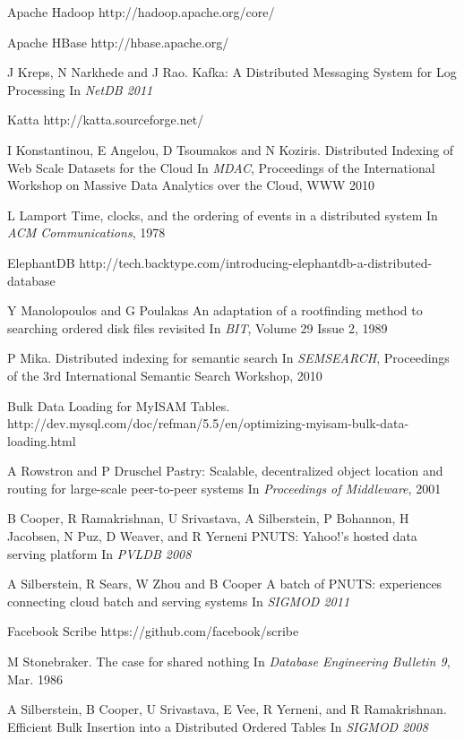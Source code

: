 \documentclass[10pt,twocolumn,preprint,natbib,authoryear]{sigplanconf}
\begin{document}
\begin{thebibliography}
Apache Hadoop
\newblock http://hadoop.apache.org/core/

Apache HBase
\newblock http://hbase.apache.org/

J Kreps, N Narkhede and J Rao.
\newblock Kafka: A Distributed Messaging System for Log Processing
\newblock In 
\emph{NetDB 2011}

Katta
\newblock http://katta.sourceforge.net/

I Konstantinou, E Angelou, D Tsoumakos and N Koziris.
\newblock Distributed Indexing of Web Scale Datasets for the Cloud
\newblock In
\emph{MDAC}, Proceedings of the International Workshop on Massive Data Analytics over the Cloud, WWW 2010

L Lamport
\newblock Time, clocks, and the ordering of events in a distributed system
\newblock In
\emph{ACM Communications}, 1978

ElephantDB
\newblock http://tech.backtype.com/introducing-elephantdb-a-distributed-database

Y Manolopoulos and G Poulakas
\newblock An adaptation of a rootfinding method to searching ordered disk files revisited
\newblock In
\emph{BIT}, Volume 29 Issue 2, 1989

P Mika.
\newblock Distributed indexing for semantic search
\newblock In
\emph{SEMSEARCH}, Proceedings of the 3rd International Semantic Search Workshop, 2010

Bulk Data Loading for MyISAM Tables.
\newblock http://dev.mysql.com/doc/refman/5.5/en/optimizing-myisam-bulk-data-loading.html

A Rowstron and P Druschel
\newblock Pastry: Scalable, decentralized object location and routing for large-scale peer-to-peer systems
\newblock In
\emph{Proceedings of Middleware}, 2001

B Cooper, R Ramakrishnan, U Srivastava, A Silberstein, P Bohannon, H Jacobsen, N Puz, D Weaver, and R 
Yerneni
\newblock PNUTS: Yahoo!'s hosted data serving platform
\newblock In
\emph{PVLDB 2008}

A Silberstein, R Sears, W Zhou and B Cooper
\newblock A batch of PNUTS: experiences connecting cloud batch and serving systems
\newblock In
\emph{SIGMOD 2011}

Facebook Scribe
\newblock https://github.com/facebook/scribe

M Stonebraker.
\newblock The case for shared nothing
\newblock In
\emph{Database Engineering Bulletin 9}, Mar. 1986

A Silberstein, B Cooper, U Srivastava, E Vee, R Yerneni, and R Ramakrishnan.
\newblock Efficient Bulk Insertion into a Distributed Ordered Tables
\newblock In
\emph{SIGMOD 2008}


\end{thebibliography}
\end{document}
